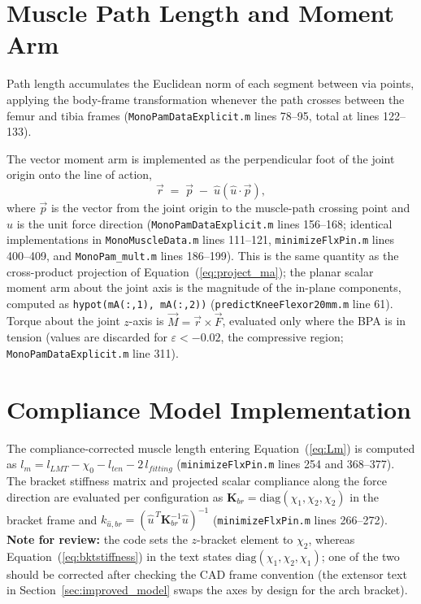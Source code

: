 \section{Muscle Path Length and Moment Arm}

Path length accumulates the Euclidean norm of each segment between via points,
applying the body-frame transformation whenever the path crosses between the femur
and tibia frames (\texttt{MonoPamDataExplicit.m} lines 78--95, total at lines
122--133).

The vector moment arm is implemented as the perpendicular foot of the joint origin
onto the line of action,
\begin{equation}
    \vec{r} \;=\; \vec{p} \;-\; \hat{u}\left(\hat{u}\cdot\vec{p}\right),
    \label{eq:app_perpfoot}
\end{equation}
where $\vec{p}$ is the vector from the joint origin to the muscle-path crossing
point and $\hat{u}$ is the unit force direction
(\texttt{MonoPamDataExplicit.m} lines 156--168; identical implementations in
\texttt{MonoMuscleData.m} lines 111--121, \texttt{minimizeFlxPin.m} lines 400--409,
and \texttt{MonoPam\_mult.m} lines 186--199). This is the same quantity as the
cross-product projection of Equation~(\ref{eq:project_ma}); the planar scalar
moment arm about the joint axis is the magnitude of the in-plane components,
computed as \texttt{hypot(mA(:,1), mA(:,2))}
(\texttt{predictKneeFlexor20mm.m} line 61). Torque about the joint $z$-axis is
$\vec{M} = \vec{r}\times\vec{F}$, evaluated only where the BPA is in tension
(values are discarded for $\varepsilon < -0.02$, the compressive region;
\texttt{MonoPamDataExplicit.m} line 311).

\section{Compliance Model Implementation}

The compliance-corrected muscle length entering
Equation~(\ref{eq:Lm}) is computed as
$l_{m} = l_{LMT} - \chi_{0} - l_{ten} - 2\,l_{fitting}$
(\texttt{minimizeFlxPin.m} lines 254 and 368--377). The bracket stiffness matrix
and projected scalar compliance along the force direction are evaluated per
configuration as
$\mathbf{K}_{br} = \mathrm{diag}(\chi_{1},\chi_{2},\chi_{2})$ in the bracket frame
and $k_{\hat{u},br} = \left(\hat{u}^{\,T}\mathbf{K}_{br}^{-1}\hat{u}\right)^{-1}$
(\texttt{minimizeFlxPin.m} lines 266--272).
\textbf{Note for review:} the code sets the $z$-bracket element to $\chi_{2}$,
whereas Equation~(\ref{eq:bktstiffness}) in the text states
$\mathrm{diag}(\chi_{1},\chi_{2},\chi_{1})$; one of the two should be corrected
after checking the CAD frame convention (the extensor text in
Section~\ref{sec:improved_model} swaps the axes by design for the arch bracket).

